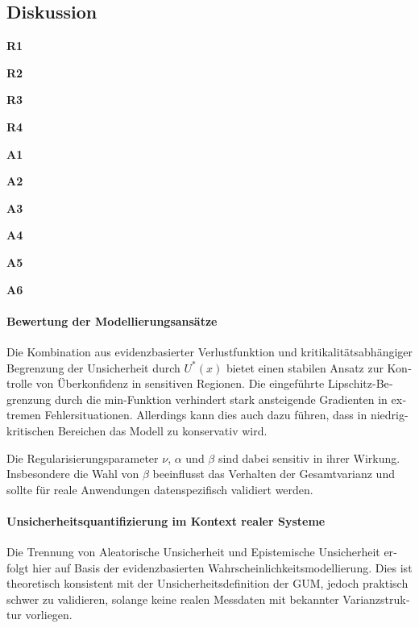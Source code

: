 \begin{otherlanguage}{ngerman}




\section{Diskussion}



\textbf{R1}


\textbf{R2}


\textbf{R3}


\textbf{R4}


\textbf{A1}


\textbf{A2}


\textbf{A3}


\textbf{A4}


\textbf{A5}


\textbf{A6}

\paragraph{Bewertung der Modellierungsansätze}

Die Kombination aus evidenzbasierter Verlustfunktion und kritikalitätsabhängiger Begrenzung der Unsicherheit durch $U^*(x)$ bietet einen stabilen Ansatz zur Kontrolle von Überkonfidenz in sensitiven Regionen. Die eingeführte Lipschitz-Begrenzung durch die min-Funktion verhindert stark ansteigende Gradienten in extremen Fehlersituationen.  Allerdings kann dies auch dazu führen, dass in niedrig-kritischen Bereichen das Modell zu konservativ wird.

Die Regularisierungsparameter $\nu$, $\alpha$ und $\beta$ sind dabei sensitiv in ihrer Wirkung. Insbesondere die Wahl von $\beta$ beeinflusst das Verhalten der Gesamtvarianz und sollte für reale Anwendungen datenspezifisch validiert werden.

\paragraph{Unsicherheitsquantifizierung im Kontext realer Systeme}

Die Trennung von \gls{Aleatorische Unsicherheit} und \gls{Epistemische Unsicherheit} erfolgt hier auf Basis der evidenzbasierten Wahrscheinlichkeitsmodellierung. Dies ist theoretisch konsistent mit der Unsicherheitsdefinition der GUM, jedoch praktisch schwer zu validieren, solange keine realen Messdaten mit bekannter Varianzstruktur vorliegen.


\end{otherlanguage}

